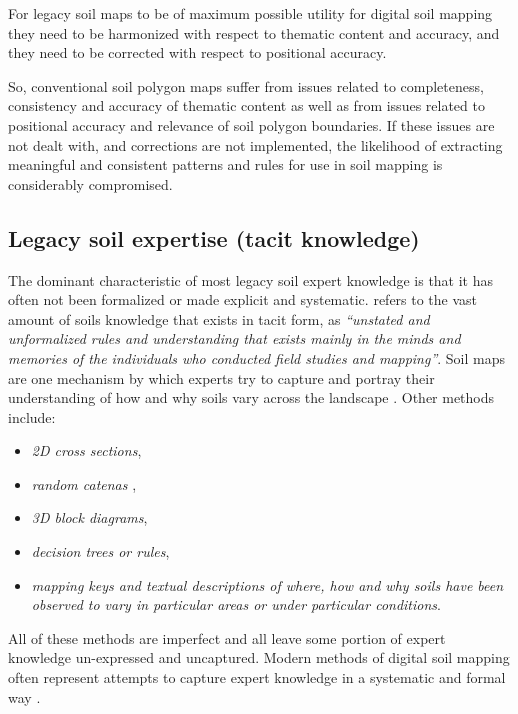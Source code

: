 \documentclass[11pt]{krantz}
\makeatletter
\newenvironment{kframe}{%
\medskip{}
\setlength{\fboxsep}{.8em}
 \def\at@end@of@kframe{}%
 \ifinner\ifhmode%
  \def\at@end@of@kframe{\end{minipage}}%
  \begin{minipage}{\columnwidth}%
 \fi\fi%
 \def\FrameCommand##1{\hskip\@totalleftmargin \hskip-\fboxsep
 \colorbox{shadecolor}{##1}\hskip-\fboxsep
     \hskip-\linewidth \hskip-\@totalleftmargin \hskip\columnwidth}%
 \MakeFramed {\advance\hsize-\width
   \@totalleftmargin\z@ \linewidth\hsize
   \@setminipage}}%
 {\par\unskip\endMakeFramed%
 \at@end@of@kframe}
\newenvironment{rmdblock}[1]
  {
  \begin{itemize}
  \renewcommand{\labelitemi}{
    \raisebox{-.7\height}[0pt][0pt]{
      {\setkeys{Gin}{width=3em,keepaspectratio}\texttt{[image: images/\#1]}}
    }
  }
  \setlength{\fboxsep}{1em}
  \begin{kframe}
  \item
  }
  {
  \end{kframe}
  \end{itemize}
  }
\newenvironment{rmdnote}
  {\begin{rmdblock}{note}}
  {\end{rmdblock}}
\theoremstyle{definition}
\theoremstyle{definition}
\theoremstyle{definition}
\theoremstyle{remark}
\makeatother
\begin{document}
\begin{rmdnote}
For legacy soil maps to be of maximum possible utility for digital soil
mapping they need to be harmonized with respect to thematic content and
accuracy, and they need to be corrected with respect to positional
accuracy.
\end{rmdnote}

So, conventional soil polygon maps suffer from issues related to
completeness, consistency and accuracy of thematic content as well as
from issues related to positional accuracy and relevance of soil polygon
boundaries. If these issues are not dealt with, and corrections are not
implemented, the likelihood of extracting meaningful and consistent
patterns and rules for use in soil mapping is considerably compromised.

\hypertarget{tacit-knowledge}{%
\subsection{Legacy soil expertise (tacit
knowledge)}\label{tacit-knowledge}}

The dominant characteristic of most legacy soil expert knowledge is that
it has often not been formalized or made explicit and systematic.
\citet{Hudson2000SSSAJ} refers to the vast amount of soils knowledge
that exists in tacit form, as \emph{``unstated and unformalized rules
and understanding that exists mainly in the minds and memories of the
individuals who conducted field studies and mapping''}. Soil maps are
one mechanism by which experts try to capture and portray their
understanding of how and why soils vary across the landscape
\citep{Bui2004Geoderma}. Other methods include:

\begin{itemize}
\item
  \emph{2D cross sections},
\item
  \emph{random catenas} \citep{McBratney2006WCSS},
\item
  \emph{3D block diagrams},
\item
  \emph{decision trees or rules},
\item
  \emph{mapping keys and textual descriptions of where, how and why
  soils have been observed to vary in particular areas or under
  particular conditions}.
\end{itemize}

All of these methods are imperfect and all leave some portion of expert
knowledge un-expressed and uncaptured. Modern methods of digital soil
mapping often represent attempts to capture expert knowledge in a
systematic and formal way
\citep{Zhu2001, McBratney2003Geoderma, Bui2004Geoderma, MacMillan2005CJSS}.
\end{document}
